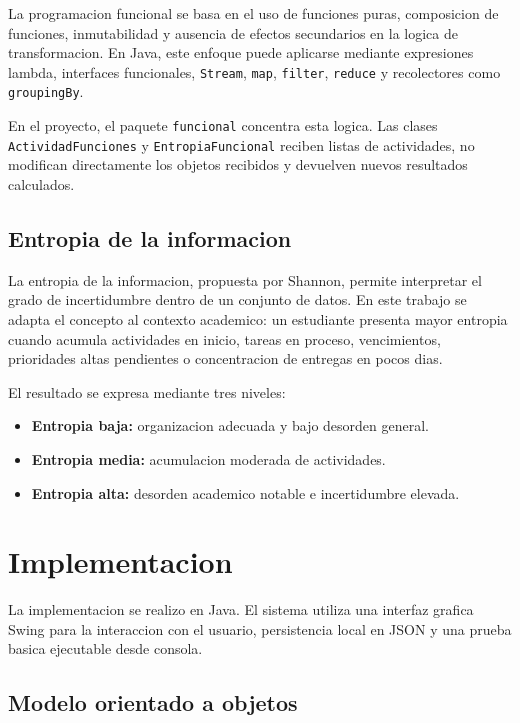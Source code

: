 \documentclass[12pt]{article}
\begin{document}
La programacion funcional se basa en el uso de funciones puras, composicion de funciones, inmutabilidad y ausencia de efectos secundarios en la logica de transformacion. En Java, este enfoque puede aplicarse mediante expresiones lambda, interfaces funcionales, \texttt{Stream}, \texttt{map}, \texttt{filter}, \texttt{reduce} y recolectores como \texttt{groupingBy}.

En el proyecto, el paquete \texttt{funcional} concentra esta logica. Las clases \texttt{ActividadFunciones} y \texttt{EntropiaFuncional} reciben listas de actividades, no modifican directamente los objetos recibidos y devuelven nuevos resultados calculados.

\subsection{Entropia de la informacion}

La entropia de la informacion, propuesta por Shannon, permite interpretar el grado de incertidumbre dentro de un conjunto de datos. En este trabajo se adapta el concepto al contexto academico: un estudiante presenta mayor entropia cuando acumula actividades en inicio, tareas en proceso, vencimientos, prioridades altas pendientes o concentracion de entregas en pocos dias.

El resultado se expresa mediante tres niveles:

\begin{itemize}
    \item \textbf{Entropia baja:} organizacion adecuada y bajo desorden general.
    \item \textbf{Entropia media:} acumulacion moderada de actividades.
    \item \textbf{Entropia alta:} desorden academico notable e incertidumbre elevada.
\end{itemize}

\section{Implementacion}

La implementacion se realizo en Java. El sistema utiliza una interfaz grafica Swing para la interaccion con el usuario, persistencia local en JSON y una prueba basica ejecutable desde consola.

\subsection{Modelo orientado a objetos}
\end{document}
